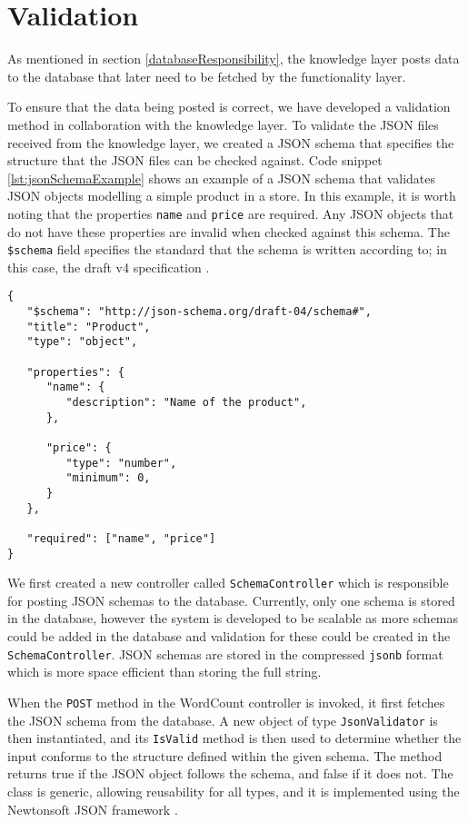 \section{Validation}

As mentioned in section \ref{databaseResponsibility}, the knowledge layer posts data to the database that later need to be fetched by the functionality layer.

To ensure that the data being posted is correct, we have developed a validation method in collaboration with the knowledge layer.
To validate the JSON files received from the knowledge layer, we created a JSON schema that specifies the structure that the JSON files can be checked against. 
Code snippet \ref{lst:jsonSchemaExample} shows an example of a JSON schema that validates JSON objects modelling a simple product in a store. In this example, it is worth noting that the properties \texttt{name} and \texttt{price} are required. Any JSON objects that do not have these properties are invalid when checked against this schema. The \texttt{\$schema} field specifies the standard that the schema is written according to; in this case, the draft v4 specification \cite{tutorialspoint_jsonschema}.

\begin{lstlisting}[language=CSharp, caption={An example of a basic JSON schema.}, label={lst:jsonSchemaExample}]
{
   "$schema": "http://json-schema.org/draft-04/schema#",
   "title": "Product",
   "type": "object",
	
   "properties": {		
      "name": {
         "description": "Name of the product",
      },
		
      "price": {
         "type": "number",
         "minimum": 0,
      }
   },
	
   "required": ["name", "price"]
}
\end{lstlisting}

We first created a new controller called \texttt{SchemaController} which is responsible for posting JSON schemas to the database. 
Currently, only one schema is stored in the database, however the system is developed to be scalable as more schemas could be added in the database and validation for these could be created in the \texttt{SchemaController}.
JSON schemas are stored in the compressed \texttt{jsonb} format which is more space efficient than storing the full string.

When the \texttt{POST} method in the WordCount controller is invoked, it first fetches the JSON schema from the database.
A new object of type \texttt{JsonValidator} is then instantiated, and its \texttt{IsValid} method is then used to determine whether the input conforms to the structure defined within the given schema. 
The method returns true if the JSON object follows the schema, and false if it does not.
The class is generic, allowing reusability for all types, and it is implemented using the Newtonsoft JSON framework \cite{Json.NET}. 

